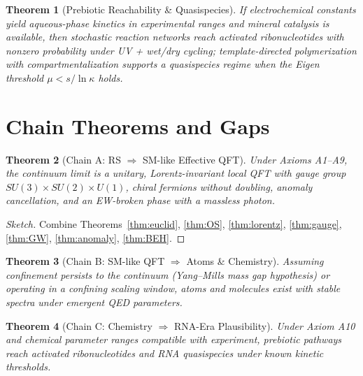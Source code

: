 \documentclass[11pt]{article}
\theoremstyle{plain}
\newtheorem{theorem}{Theorem}[section]
\theoremstyle{definition}
\theoremstyle{remark}
\begin{document}
\begin{theorem}[Prebiotic Reachability \& Quasispecies]\label{thm:prebio}
If electrochemical constants yield aqueous-phase kinetics in experimental ranges and mineral catalysis is available, then stochastic reaction networks reach activated ribonucleotides with nonzero probability under UV + wet/dry cycling; template-directed polymerization with compartmentalization supports a quasispecies regime when the Eigen threshold $\mu < s/\ln\kappa$ holds.
\end{theorem}

\section{Chain Theorems and Gaps}

\begin{theorem}[Chain A: \textsf{RS} $\Rightarrow$ SM-like Effective QFT]\label{thm:chainA}
Under Axioms A1--A9, the continuum limit is a unitary, Lorentz-invariant local QFT with gauge group $SU(3)\times SU(2)\times U(1)$, chiral fermions without doubling, anomaly cancellation, and an EW-broken phase with a massless photon.
\end{theorem}
\begin{proof}[Sketch]
Combine Theorems~\ref{thm:euclid}, \ref{thm:OS}, \ref{thm:lorentz}, \ref{thm:gauge}, \ref{thm:GW}, \ref{thm:anomaly}, \ref{thm:BEH}.
\end{proof}

\begin{theorem}[Chain B: SM-like QFT $\Rightarrow$ Atoms \& Chemistry]\label{thm:chainB}
Assuming confinement persists to the continuum (Yang--Mills mass gap hypothesis) or operating in a confining scaling window, atoms and molecules exist with stable spectra under emergent QED parameters.
\end{theorem}

\begin{theorem}[Chain C: Chemistry $\Rightarrow$ RNA-Era Plausibility]\label{thm:chainC}
Under Axiom A10 and chemical parameter ranges compatible with experiment, prebiotic pathways reach activated ribonucleotides and RNA quasispecies under known kinetic thresholds.
\end{theorem}
\end{document}

